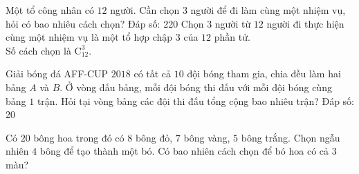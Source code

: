 \begin{vd}%
	Một tổ công nhân có $12$ người. Cần chọn $3$ người để đi làm cùng một nhiệm vụ, hỏi có bao nhiêu cách chọn?
	\hspace*{6cm} {\sf\fontsize{10pt}{1pt}\selectfont Đáp số: 220 }
	\loigiai
	{Chọn $3$ người từ $12$ người đi thực hiện cùng một nhiệm vụ là một tổ hợp chập $3$ của $12$ phần tử.\\
		Số cách chọn là $\mathrm{C}_{12}^3$.
	}
\end{vd}

\begin{vd}%
	Giải bóng đá AFF-CUP $2018$ có tất cả $10$ đội bóng tham gia, chia đều làm hai bảng $A$ và $B$. Ở vòng đấu bảng, mỗi đội bóng thi đấu với mỗi đội bóng cùng bảng $1$ trận. Hỏi tại vòng bảng các đội thi đấu tổng cộng bao nhiêu trận?	
	\hspace*{3cm} {\sf\fontsize{10pt}{1pt}\selectfont Đáp số: 20}
\end{vd}

\begin{vd}%
	Có $20$ bông hoa trong đó có $8$ bông đỏ, $7$ bông vàng, $5$ bông trắng. Chọn ngẫu nhiên $4$ bông để
	tạo thành một bó. Có bao nhiên cách chọn để bó hoa có cả $3$ màu?
\end{vd}

